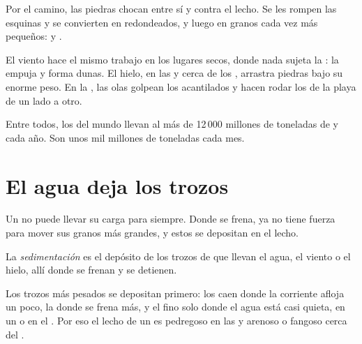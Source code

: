 Por el camino, las piedras chocan entre sí y contra el lecho. Se les rompen
las esquinas y se convierten en  redondeados, y luego en granos cada
vez más pequeños:  y .

El viento hace el mismo trabajo en los lugares secos, donde nada sujeta la
: la empuja y forma dunas. El hielo, en las  y cerca de los
, arrastra piedras bajo su enorme peso. En la , las olas golpean
los acantilados y hacen rodar los  de la playa de un lado a otro.

\begin{remark}[¿Cuánto?]\label{rem:g5:water-shapes-the-land:how-much}
Entre todos, los  del mundo llevan al  más de 12\,000 millones de
toneladas de  y  cada año. Son unos mil millones de toneladas
cada mes.
\end{remark}

\section{El agua deja los trozos}

Un  no puede llevar su carga para siempre. Donde se frena, ya no tiene
fuerza para mover sus granos más grandes, y estos se depositan en el lecho.

\begin{definition}[Sedimentación]\label{def:g5:water-shapes-the-land:deposition}
La \emph{sedimentación} es el depósito
de los trozos de  que llevan el agua, el viento o el hielo, allí donde
se frenan y se detienen.
\end{definition}

Los trozos más pesados se depositan primero: los  caen donde la
corriente afloja un poco, la  donde se frena más, y el  fino solo
donde el agua está casi quieta, en un  o en el . Por eso el lecho de
un  es pedregoso en las  y arenoso o fangoso cerca del .

